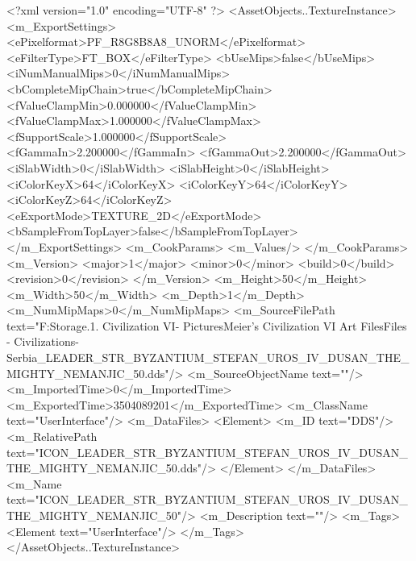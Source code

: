 <?xml version="1.0" encoding="UTF-8" ?>
<AssetObjects..TextureInstance>
	<m_ExportSettings>
		<ePixelformat>PF_R8G8B8A8_UNORM</ePixelformat>
		<eFilterType>FT_BOX</eFilterType>
		<bUseMips>false</bUseMips>
		<iNumManualMips>0</iNumManualMips>
		<bCompleteMipChain>true</bCompleteMipChain>
		<fValueClampMin>0.000000</fValueClampMin>
		<fValueClampMax>1.000000</fValueClampMax>
		<fSupportScale>1.000000</fSupportScale>
		<fGammaIn>2.200000</fGammaIn>
		<fGammaOut>2.200000</fGammaOut>
		<iSlabWidth>0</iSlabWidth>
		<iSlabHeight>0</iSlabHeight>
		<iColorKeyX>64</iColorKeyX>
		<iColorKeyY>64</iColorKeyY>
		<iColorKeyZ>64</iColorKeyZ>
		<eExportMode>TEXTURE_2D</eExportMode>
		<bSampleFromTopLayer>false</bSampleFromTopLayer>
	</m_ExportSettings>
	<m_CookParams>
		<m_Values/>
	</m_CookParams>
	<m_Version>
		<major>1</major>
		<minor>0</minor>
		<build>0</build>
		<revision>0</revision>
	</m_Version>
	<m_Height>50</m_Height>
	<m_Width>50</m_Width>
	<m_Depth>1</m_Depth>
	<m_NumMipMaps>0</m_NumMipMaps>
	<m_SourceFilePath text="F:\Mod Storage\2.1. Civilization VI\Mods\Archive - Pictures\Sid Meier's Civilization VI Art Files\Art Files - Civilizations\Civilization - Serbia\ICON_LEADER_STR_BYZANTIUM_STEFAN_UROS_IV_DUSAN_THE_MIGHTY_NEMANJIC_50.dds"/>
	<m_SourceObjectName text=""/>
	<m_ImportedTime>0</m_ImportedTime>
	<m_ExportedTime>3504089201</m_ExportedTime>
	<m_ClassName text="UserInterface"/>
	<m_DataFiles>
		<Element>
			<m_ID text="DDS"/>
			<m_RelativePath text="ICON_LEADER_STR_BYZANTIUM_STEFAN_UROS_IV_DUSAN_THE_MIGHTY_NEMANJIC_50.dds"/>
		</Element>
	</m_DataFiles>
	<m_Name text="ICON_LEADER_STR_BYZANTIUM_STEFAN_UROS_IV_DUSAN_THE_MIGHTY_NEMANJIC_50"/>
	<m_Description text=""/>
	<m_Tags>
		<Element text="UserInterface"/>
	</m_Tags>
</AssetObjects..TextureInstance>

